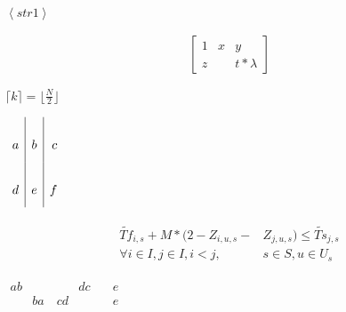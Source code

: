 \documentclass{article}
\begin{document}



    $\left\langle str1 \right\rangle$

    \begin{align}
        \left[
        \begin{matrix}
            1 & x & y\\
            z & & t*\lambda
        \end{matrix}    
        \right]
    \end{align}

    $\lceil k \rceil = \lfloor\frac{N}{2}\rfloor$



    $\def\arraystretch{3}
    \begin{array}{l|c|r}
        a & b & c\\
        d & e & f
    \end{array}$
    

    \begin{align}
        \begin{split}
            \widetilde{Tf}_{i,s} + M*(2-Z_{i,u,s}-&Z_{j,u,s}) \leq 
            \widetilde{Ts}_{j,s} \\
            \forall i \in I, j \in I, i < j,& s \in S, u \in U_{s}    
        \end{split}
    \end{align}

    $\begin{alignedat}{3}
        ab& &dc \quad &e\\
        &ba \quad cd& &e
    \end{alignedat}$
\end{document}
